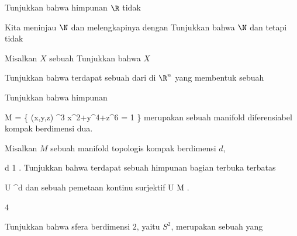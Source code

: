 {}
{

Tunjukkan bahwa himpunan
 $\R$ tidak

}
{} {}

{}
{

Kita meninjau
$\N$ dan melengkapinya dengan
Tunjukkan bahwa $\N$
dan
tetapi tidak

}
{} {}

{}
{

Misalkan $X$ sebuah
Tunjukkan bahwa $X$

}
{} {}

{}
{

Tunjukkan bahwa terdapat sebuah
dari
di $\R^n$ yang membentuk sebuah

}
{} {}

{}
{

Tunjukkan bahwa himpunan

\mavergleichskettedisp
{\vergleichskette
{ M
}
{ =} { \left\{ (x,y,z) \in \R^3  \mid   x^2+y^4+z^6 = 1        \right\}
}
{ } {
}
{ } {
}
{ } {
}
}
{}{}{}
merupakan sebuah manifold diferensiabel kompak berdimensi dua.

}
{} {}

{}
{

Misalkan $M$ sebuah manifold topologis kompak berdimensi $d$,

\mavergleichskette
{\vergleichskette
{ d
}
{ \geq }{ 1
}
{  }{
}
{    }{
}
{   }{
}
}
{}{}{.}
Tunjukkan bahwa terdapat sebuah himpunan bagian terbuka terbatas

\mavergleichskette
{\vergleichskette
{ U
}
{ \subseteq }{ \R^d
}
{  }{
}
{    }{
}
{   }{
}
}
{}{}{}
dan sebuah pemetaan kontinu surjektif
\maabbdisp {\varphi} { U } { M
} {}.

}
{} {}


{4}
{

Tunjukkan bahwa sfera berdimensi $2$, yaitu $S^2$, merupakan sebuah
yang

}
{} {}

